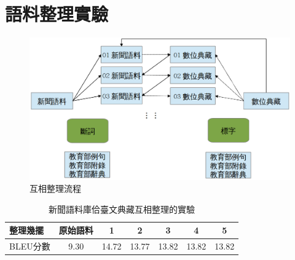 \section{語料整理實驗}
\label{節：語料整理實驗}

\begin{figure}
\centerline{\includegraphics[keepaspectratio,width=40em]{圖/互相整理架構}}
\caption{互相整理流程}
\label{圖：互相整理架構}
\end{figure}

\begin{table}
\caption{新聞語料庫佮臺文典藏互相整理的實驗}
\label{表：互相整理實驗}
\centering
\begin{tabular}{l|cccccc}
整理幾擺 & 原始語料 & 1 & 2 & 3 & 4 & 5\\
\hline
BLEU分數 & 9.30 & 14.72 & 13.77 & 13.82 & 13.82 & 13.82\\
\end{tabular}
\end{table}

